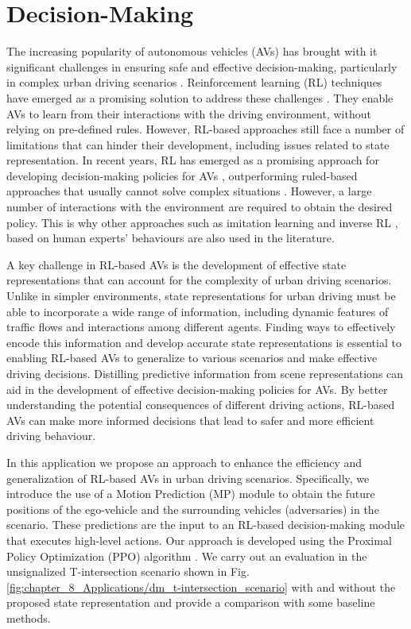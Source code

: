 \section{Decision-Making}
\label{sec:8_decision_making}


The increasing popularity of autonomous vehicles (AVs) has brought with it significant challenges in ensuring safe and effective decision-making, particularly in complex urban driving scenarios \cite{Yurtsever2019}. Reinforcement learning (RL) techniques have emerged as a promising solution to address these challenges \cite{Ravi2020}. They enable AVs to learn from their interactions with the driving environment, without relying on pre-defined rules. However, RL-based approaches still face a number of limitations that can hinder their development, including issues related to state representation. In recent years, RL has emerged as a promising approach for developing decision-making policies for AVs \cite{Mnih2015}, outperforming ruled-based approaches that usually cannot solve complex situations \cite{Zhu2019}. However, a large number of interactions with the environment are required to obtain the desired policy. This is why other approaches such as imitation learning \cite{SilverHuangEtAl16nature} and inverse RL \cite{Ross2010}, based on human experts' behaviours are also used in the literature. 

A key challenge in RL-based AVs is the development of effective state representations that can account for the complexity of urban driving scenarios. Unlike in simpler environments, state representations for urban driving must be able to incorporate a wide range of information, including dynamic features of traffic flows and interactions among different agents. Finding ways to effectively encode this information and develop accurate state representations is essential to enabling RL-based AVs to generalize to various scenarios and make effective driving decisions. Distilling predictive information from scene representations can aid in the development of effective decision-making policies for AVs. By better understanding the potential consequences of different driving actions, RL-based AVs can make more informed decisions that lead to safer and more efficient driving behaviour.

In this application we propose an approach to enhance the efficiency and generalization of RL-based AVs in urban driving scenarios. Specifically, we introduce the use of a Motion Prediction (MP) module to obtain the future positions of the ego-vehicle and the surrounding vehicles (adversaries) in the scenario. These predictions are the input to an RL-based decision-making module that executes high-level actions. Our approach is developed using the Proximal Policy Optimization (PPO) algorithm  \cite{Schulman2017}.  We carry out an evaluation in the unsignalized T-intersection scenario shown in Fig. \ref{fig:chapter_8_Applications/dm_t-intersection_scenario} with and without the proposed state representation and provide a comparison with some baseline methods.

